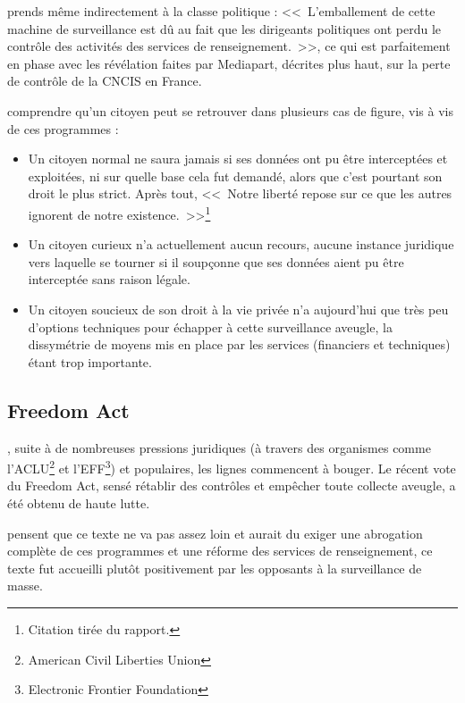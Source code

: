  prends même indirectement à la classe politique :
<<~L'emballement de cette machine de surveillance est dû au fait que les
dirigeants politiques ont perdu le contrôle des activités des services de
renseignement.~>>, ce qui est parfaitement en phase avec les révélation faites
par Mediapart, décrites plus haut, sur la perte de contrôle de la CNCIS en
France.

 comprendre qu'un citoyen peut se retrouver dans
plusieurs cas de figure, vis à vis de ces programmes :

\begin{itemize}
  \item Un citoyen normal ne saura jamais si ses données ont pu être
  interceptées et exploitées, ni sur quelle base cela fut demandé, alors que
  c'est pourtant son droit le plus strict. Après tout, <<~Notre liberté repose
  sur ce que les autres ignorent de notre existence.~>>\footnote{Citation tirée
  du rapport.}
  \item Un citoyen curieux n'a actuellement aucun recours, aucune instance
  juridique vers laquelle se tourner si il soupçonne que ses données aient pu
  être interceptée sans raison légale.
  \item Un citoyen soucieux de son droit à la vie privée n'a aujourd'hui que
  très peu d'options techniques pour échapper à cette surveillance aveugle, la
  dissymétrie de moyens mis en place par les services (financiers et techniques)
  étant trop importante.
\end{itemize}

\subsection{Freedom Act}

, suite à de nombreuses pressions juridiques (à travers des
organismes comme l'ACLU\footnote{American Civil Liberties Union} et
l'EFF\footnote{Electronic Frontier Foundation}) et populaires, les lignes
commencent à bouger. Le récent vote du Freedom Act, sensé rétablir des contrôles
et empêcher toute collecte aveugle, a été obtenu de haute
lutte\autocite{freedom}.

 pensent que ce texte ne va pas assez loin et
aurait du exiger une abrogation complète de ces programmes et une réforme des services de
renseignement, ce texte fut accueilli plutôt positivement par les opposants à la
surveillance de masse.


